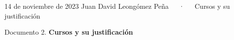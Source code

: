 \documentclass[11pt,a4paper,]{awesome-cv}
\begin{document}
\makecvheader

\makecvfooter
  {14 de noviembre de 2023}
    {Juan David Leongómez Peña~~~·~~~Cursos y su justificación}
  {\thepage}





\vspace{4mm}
\begin{tcolorbox}[enhanced,
        on line, 
        boxsep=4pt, left=0pt,right=0pt,top=0pt,bottom=0pt,
        colframe=white,colback=black]
  
\color{white}
\begin{LARGE}\begin{center}
Documento 2. \textbf{Cursos y su justificación}
\end{center}\end{LARGE}
\end{tcolorbox}
\end{document}
